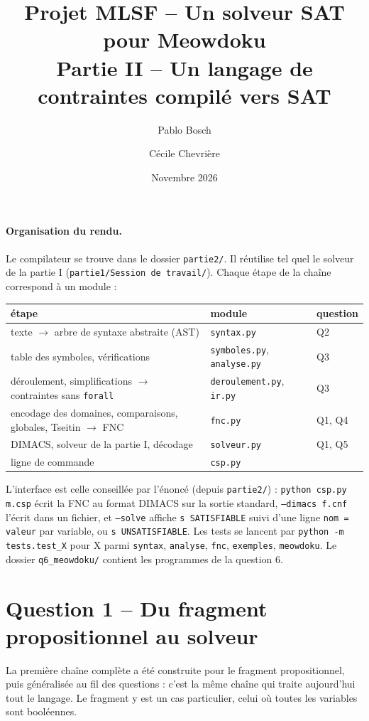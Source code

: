 \documentclass[11pt,a4paper]{article}
\title{Projet MLSF -- Un solveur SAT pour Meowdoku\\ \large Partie II -- Un langage de contraintes compilé vers SAT}
\author{Pablo Bosch \and Cécile Chevrière}
\date{Novembre 2026}
\newcommand{\code}[1]{\texttt{#1}}
\begin{document}
\maketitle

\paragraph{Organisation du rendu.} Le compilateur se trouve dans le dossier \code{partie2/}.
Il réutilise tel quel le solveur de la partie I (\code{partie1/Session de travail/}). Chaque
étape de la chaîne correspond à un module :
\begin{center}
\begin{tabular}{lll}
\toprule
étape & module & question \\
\midrule
texte $\to$ arbre de syntaxe abstraite (AST) & \code{syntax.py} & Q2 \\
table des symboles, vérifications & \code{symboles.py}, \code{analyse.py} & Q3 \\
déroulement, simplifications $\to$ contraintes sans \code{forall} & \code{deroulement.py}, \code{ir.py} & Q3 \\
encodage des domaines, comparaisons, globales, Tseitin $\to$ FNC & \code{fnc.py} & Q1, Q4 \\
DIMACS, solveur de la partie I, décodage & \code{solveur.py} & Q1, Q5 \\
ligne de commande & \code{csp.py} & \\
\bottomrule
\end{tabular}
\end{center}
L'interface est celle conseillée par l'énoncé (depuis \code{partie2/}) :
\code{python csp.py m.csp} écrit la FNC au format DIMACS sur la sortie standard,
\code{--dimacs f.cnf} l'écrit dans un fichier, et \code{--solve} affiche \code{s SATISFIABLE}
suivi d'une ligne \code{nom = valeur} par variable, ou \code{s UNSATISFIABLE}. Les tests se
lancent par \code{python -m tests.test\_X} pour X parmi \code{syntax}, \code{analyse},
\code{fnc}, \code{exemples}, \code{meowdoku}. Le dossier \code{q6\_meowdoku/} contient les
programmes de la question 6.

\section{Question 1 -- Du fragment propositionnel au solveur}

La première chaîne complète a été construite pour le fragment propositionnel, puis
généralisée au fil des questions : c'est la même chaîne qui traite aujourd'hui tout le
langage. Le fragment y est un cas particulier, celui où toutes les variables sont booléennes.
\end{document}

